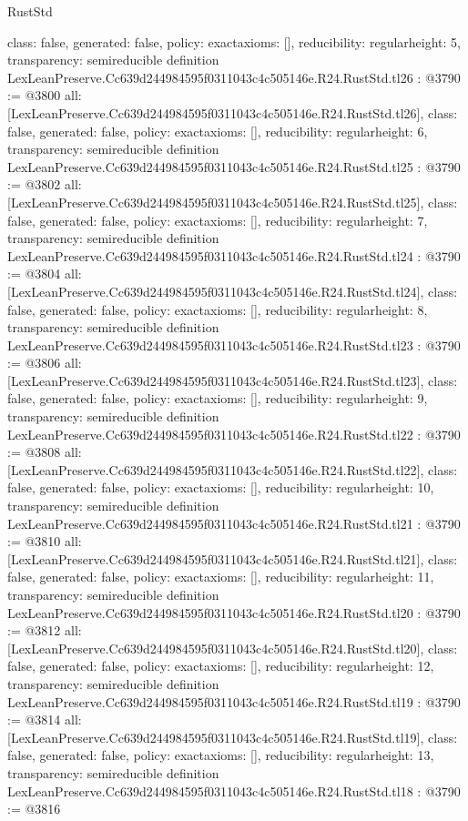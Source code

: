 \begin{lexlean}{RustStd}
\begin{coremodule}
{  class: false,
  generated: false,
  policy: exact{axioms: []},
  reducibility: regular{height: 5},
  transparency: semireducible
}
definition LexLeanPreserve.Cc639d244984595f0311043c4c505146e.R24.RustStd.tl26 : @3790 := @3800 {
  all: [LexLeanPreserve.Cc639d244984595f0311043c4c505146e.R24.RustStd.tl26],
  class: false,
  generated: false,
  policy: exact{axioms: []},
  reducibility: regular{height: 6},
  transparency: semireducible
}
definition LexLeanPreserve.Cc639d244984595f0311043c4c505146e.R24.RustStd.tl25 : @3790 := @3802 {
  all: [LexLeanPreserve.Cc639d244984595f0311043c4c505146e.R24.RustStd.tl25],
  class: false,
  generated: false,
  policy: exact{axioms: []},
  reducibility: regular{height: 7},
  transparency: semireducible
}
definition LexLeanPreserve.Cc639d244984595f0311043c4c505146e.R24.RustStd.tl24 : @3790 := @3804 {
  all: [LexLeanPreserve.Cc639d244984595f0311043c4c505146e.R24.RustStd.tl24],
  class: false,
  generated: false,
  policy: exact{axioms: []},
  reducibility: regular{height: 8},
  transparency: semireducible
}
definition LexLeanPreserve.Cc639d244984595f0311043c4c505146e.R24.RustStd.tl23 : @3790 := @3806 {
  all: [LexLeanPreserve.Cc639d244984595f0311043c4c505146e.R24.RustStd.tl23],
  class: false,
  generated: false,
  policy: exact{axioms: []},
  reducibility: regular{height: 9},
  transparency: semireducible
}
definition LexLeanPreserve.Cc639d244984595f0311043c4c505146e.R24.RustStd.tl22 : @3790 := @3808 {
  all: [LexLeanPreserve.Cc639d244984595f0311043c4c505146e.R24.RustStd.tl22],
  class: false,
  generated: false,
  policy: exact{axioms: []},
  reducibility: regular{height: 10},
  transparency: semireducible
}
definition LexLeanPreserve.Cc639d244984595f0311043c4c505146e.R24.RustStd.tl21 : @3790 := @3810 {
  all: [LexLeanPreserve.Cc639d244984595f0311043c4c505146e.R24.RustStd.tl21],
  class: false,
  generated: false,
  policy: exact{axioms: []},
  reducibility: regular{height: 11},
  transparency: semireducible
}
definition LexLeanPreserve.Cc639d244984595f0311043c4c505146e.R24.RustStd.tl20 : @3790 := @3812 {
  all: [LexLeanPreserve.Cc639d244984595f0311043c4c505146e.R24.RustStd.tl20],
  class: false,
  generated: false,
  policy: exact{axioms: []},
  reducibility: regular{height: 12},
  transparency: semireducible
}
definition LexLeanPreserve.Cc639d244984595f0311043c4c505146e.R24.RustStd.tl19 : @3790 := @3814 {
  all: [LexLeanPreserve.Cc639d244984595f0311043c4c505146e.R24.RustStd.tl19],
  class: false,
  generated: false,
  policy: exact{axioms: []},
  reducibility: regular{height: 13},
  transparency: semireducible
}
definition LexLeanPreserve.Cc639d244984595f0311043c4c505146e.R24.RustStd.tl18 : @3790 := @3816 {
}
\end{coremodule}
\end{lexlean}

